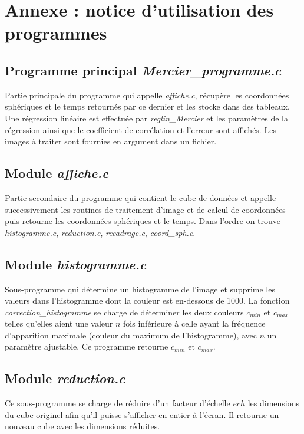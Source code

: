 \documentclass[a4paper,11pt]{article}
\numberwithin{equation}{section}
\begin{document}
\newpage
\appendix
\section{Annexe : notice d'utilisation des programmes}
\subsection{Programme principal \textit{Mercier\_programme.c}}
Partie principale du programme qui appelle \textit{affiche.c}, récupère les coordonnées sphériques et le temps retournés par ce dernier et les stocke dans des tableaux. Une régression linéaire est effectuée par \textit{reglin\_Mercier} et les paramètres de la régression ainsi que le coefficient de corrélation et l'erreur sont affichés.\newline
Les images à traiter sont fournies en argument dans un fichier.

\subsection{Module \textit{affiche.c}}
Partie secondaire du programme qui contient le cube de données et appelle successivement les routines de traitement d'image et de calcul de coordonnées puis retourne les coordonnées sphériques et le temps. Dans l'ordre on trouve \textit{histogramme.c}, \textit{reduction.c}, \textit{recadrage.c}, \textit{coord\_sph.c}.

\subsection{Module \textit{histogramme.c}}
Sous-programme qui détermine un histogramme de l'image et supprime les valeurs dans l'histogramme dont la couleur est en-dessous de 1000. La fonction \textit{correction\_histogramme} se charge de déterminer les deux couleurs $c_{min}$ et $c_{max}$ telles qu'elles aient une valeur $n$ fois inférieure à celle ayant la fréquence d'apparition maximale (couleur du maximum de l'histogramme), avec $n$ un paramètre ajustable.\newline
Ce programme retourne $c_{min}$ et $c_{max}$.

\subsection{Module \textit{reduction.c}}
Ce sous-programme se charge de réduire d'un facteur d'échelle $ech$ les dimensions du cube originel afin qu'il puisse s'afficher en entier à l'écran. Il retourne un nouveau cube avec les dimensions réduites.
\end{document}
